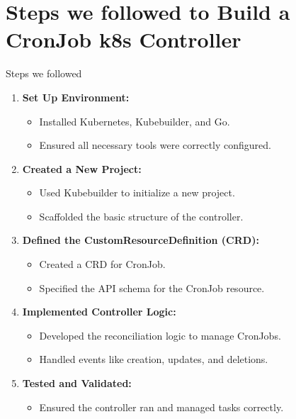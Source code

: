 \documentclass{beamer}
\begin{document}
\section{Steps we followed to Build a CronJob k8s Controller}
\begin{frame}{Steps we followed}
    \begin{enumerate}
        \item \textbf{Set Up Environment:}
        \begin{itemize}
            \item Installed Kubernetes, Kubebuilder, and Go.
            \item Ensured all necessary tools were correctly configured.
        \end{itemize}
        \item \textbf{Created a New Project:}
        \begin{itemize}
            \item Used Kubebuilder to initialize a new project.
            \item Scaffolded the basic structure of the controller.
        \end{itemize}
        \item \textbf{Defined the CustomResourceDefinition (CRD):}
        \begin{itemize}
            \item Created a CRD for CronJob.
            \item Specified the API schema for the CronJob resource.
        \end{itemize}
        \item \textbf{Implemented Controller Logic:}
        \begin{itemize}
            \item Developed the reconciliation logic to manage CronJobs.
            \item Handled events like creation, updates, and deletions.
        \end{itemize}
       
        \item \textbf{Tested and Validated:}
        \begin{itemize}
            \item Ensured the controller ran and managed tasks correctly.
        \end{itemize}
    \end{enumerate}
\end{frame}
\end{document}
